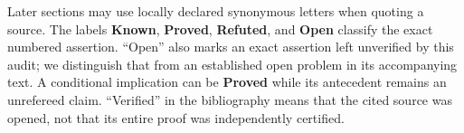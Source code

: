 \noindent\small
Later sections may use locally declared synonymous letters when quoting a source. The labels \textbf{Known}, \textbf{Proved}, \textbf{Refuted}, and \textbf{Open} classify the exact numbered assertion. ``Open'' also marks an exact assertion left unverified by this audit; we distinguish that from an established open problem in its accompanying text. A conditional implication can be \textbf{Proved} while its antecedent remains an unrefereed claim. ``Verified'' in the bibliography means that the cited source was opened, not that its entire proof was independently certified.\normalsize
